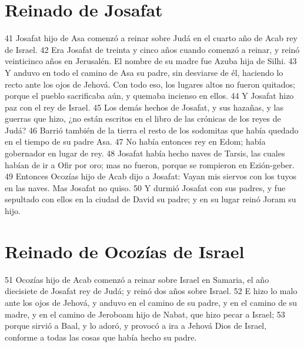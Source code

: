 \section*{Reinado de Josafat}

41 Josafat hijo de Asa comenzó a reinar sobre Judá en el cuarto año de Acab rey de Israel.
42 Era Josafat de treinta y cinco años cuando comenzó a reinar, y reinó veinticinco años en Jerusalén. El nombre de su madre fue Azuba hija de Silhi.
43 Y anduvo en todo el camino de Asa su padre, sin desviarse de él, haciendo lo recto ante los ojos de Jehová. Con todo eso, los lugares altos no fueron quitados; porque el pueblo sacrificaba aún, y quemaba incienso en ellos.
44 Y Josafat hizo paz con el rey de Israel.
45 Los demás hechos de Josafat, y sus hazañas, y las guerras que hizo, ¿no están escritos en el libro de las crónicas de los reyes de Judá?
46 Barrió también de la tierra el resto de los sodomitas que había quedado en el tiempo de su padre Asa.
47 No había entonces rey en Edom; había gobernador en lugar de rey.
48 Josafat había hecho naves de Tarsis, las cuales habían de ir a Ofir por oro; mas no fueron, porque se rompieron en Ezión-geber.
49 Entonces Ocozías hijo de Acab dijo a Josafat: Vayan mis siervos con los tuyos en las naves. Mas Josafat no quiso.
50 Y durmió Josafat con sus padres, y fue sepultado con ellos en la ciudad de David su padre; y en su lugar reinó Joram su hijo.

\section*{Reinado de Ocozías de Israel}

51 Ocozías hijo de Acab comenzó a reinar sobre Israel en Samaria, el año diecisiete de Josafat rey de Judá; y reinó dos años sobre Israel.
52 E hizo lo malo ante los ojos de Jehová, y anduvo en el camino de su padre, y en el camino de su madre, y en el camino de Jeroboam hijo de Nabat, que hizo pecar a Israel;
53 porque sirvió a Baal, y lo adoró, y provocó a ira a Jehová Dios de Israel, conforme a todas las cosas que había hecho su padre. 

